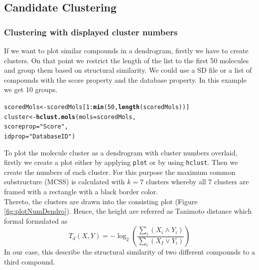 \documentclass[12pt, a4paper]{scrartcl}\usepackage[]{graphicx}\usepackage[]{color}
\makeatletter
\newcommand{\hlnum}[1]{\textcolor[rgb]{0.686,0.059,0.569}{#1}}%
\newcommand{\hlstr}[1]{\textcolor[rgb]{0.192,0.494,0.8}{#1}}%
\newcommand{\hlopt}[1]{\textcolor[rgb]{0,0,0}{#1}}%
\newcommand{\hlstd}[1]{\textcolor[rgb]{0.345,0.345,0.345}{#1}}%
\newcommand{\hlkwb}[1]{\textcolor[rgb]{0.69,0.353,0.396}{#1}}%
\newcommand{\hlkwc}[1]{\textcolor[rgb]{0.333,0.667,0.333}{#1}}%
\newcommand{\hlkwd}[1]{\textcolor[rgb]{0.737,0.353,0.396}{\textbf{#1}}}%
\newenvironment{kframe}{%
 \def\at@end@of@kframe{}%
 \ifinner\ifhmode%
  \def\at@end@of@kframe{\end{minipage}}%
  \begin{minipage}{\columnwidth}%
 \fi\fi%
 \def\FrameCommand##1{\hskip\@totalleftmargin \hskip-\fboxsep
 \colorbox{shadecolor}{##1}\hskip-\fboxsep
     \hskip-\linewidth \hskip-\@totalleftmargin \hskip\columnwidth}%
 \MakeFramed {\advance\hsize-\width
   \@totalleftmargin\z@ \linewidth\hsize
   \@setminipage}}%
 {\par\unskip\endMakeFramed%
 \at@end@of@kframe}
\newenvironment{knitrout}{}{} %
\newcommand{\Rfunction}[1]{{\texttt{#1}}}
\makeatother
\begin{document}
\newpage
\subsection{Candidate Clustering}
\subsubsection{Clustering with displayed cluster numbers}
If we want to plot similar compounds in a dendrogram, firstly we have to create clusters. On that point we restrict the length of the list to the first 50 molecules and group them based on structural similarity. We could use a SD file or a list of compounds with the score property and the database property. In this example we get 10 groups.

\begin{knitrout}
\color{fgcolor}\begin{kframe}
\begin{alltt}
\hlstd{scoredMols} \hlkwb{<-} \hlstd{scoredMols[}\hlnum{1}\hlopt{:}\hlkwd{min}\hlstd{(}\hlnum{50}\hlstd{,} \hlkwd{length}\hlstd{(scoredMols))]}
\hlstd{cluster} \hlkwb{<-} \hlkwd{hclust.mols}\hlstd{(}\hlkwc{mols}\hlstd{=scoredMols,}
                       \hlkwc{scoreprop}\hlstd{=}\hlstr{"Score"}\hlstd{,}
                       \hlkwc{idprop}\hlstd{=}\hlstr{"DatabaseID"}\hlstd{)}
\end{alltt}
\end{kframe}
\end{knitrout}
To plot the molecule cluster as a dendrogram with cluster numbers overlaid, firstly we create a plot
either by applying \Rfunction{plot} or by using \Rfunction{hclust}. Then we create the numbers of each cluster.
For this purpose the maximum common substructure (MCSS) is calculated with $k=7$ clusters whereby all 7 
clusters are framed with a rectangle with a black border color. \\[0.5em]
Thereto, the clusters are drawn into the
consisting plot (Figure \ref{fig:plotNumDendro}). Hence, the height are referred as Tanimoto 
distance which formal formulated as \cite{Rogers1960}
\[
  T_d(X,Y) = -\log_2\left(\frac{\sum_i(X_i \land Y_i)}{\sum_i(X_I \lor Y_i)}\right)
\]
In our case, this describe the structural similarity of two different compounds to a third compound. 
\end{document}
